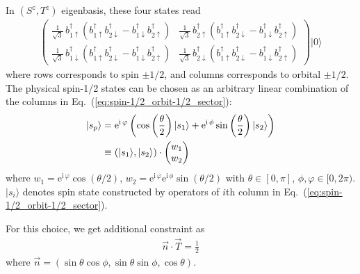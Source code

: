 \documentclass[%
 reprint,
 amsmath,amssymb,
 aps,
 pra, %
]{revtex4-1}
\newcommand{\ee}{\mathrm{e}}
\newcommand{\ii}{\mathrm{i}\,}
\newcommand{\dg}{\dagger}
\begin{document}
In $(S^z,T^z)$ eigenbasis, these four states read
\begin{align}
  \begin{pmatrix}
  \frac{1}{\sqrt{3}}\,b_{1\uparrow}^\dg\left( b_{1\uparrow}^\dg b_{2\downarrow}^\dg-b_{1\downarrow}^\dg b_{2\uparrow}^\dg \right) & 
  \frac{1}{\sqrt{3}}\,b_{2\uparrow}^\dg\left( b_{1\uparrow}^\dg b_{2\downarrow}^\dg-b_{1\downarrow}^\dg b_{2\uparrow}^\dg \right) \\[0.4cm]
  \frac{1}{\sqrt{3}}\,b_{1\downarrow}^\dg\left( b_{1\uparrow}^\dg b_{2\downarrow}^\dg-b_{1\downarrow}^\dg b_{2\uparrow}^\dg \right) & 
  \frac{1}{\sqrt{3}}\,b_{2\downarrow}^\dg\left( b_{1\uparrow}^\dg b_{2\downarrow}^\dg-b_{1\downarrow}^\dg b_{2\uparrow}^\dg \right) 
  \end{pmatrix}
  |0\rangle
  \label{eq:spin-1/2_orbit-1/2_sector}
\end{align}
where rows corresponds to spin $\pm1/2$, and columns corresponds to orbital $\pm1/2$.
The physical spin-1/2 states can be chosen as an arbitrary linear combination of the columns in Eq.~(\ref{eq:spin-1/2_orbit-1/2_sector}):
\begin{align}
  |s_p\rangle&=\ee^{\ii\varphi}\left(\cos\left( \frac{\theta}{2} \right)|s_1\rangle+\ee^{\ii\phi}\sin\left( \frac{\theta}{2} \right)|s_2\rangle \right)\notag\\
  &\equiv (|s_1\rangle, |s_2\rangle) \cdot \begin{pmatrix}w_1\\w_2\end{pmatrix} \label{}
\end{align}
where $w_1=\ee^{\ii\varphi}\cos(\theta/2)$, $w_2=\ee^{\ii\varphi}\ee^{\ii\phi}\sin(\theta/2)$ with $\theta\in[0,\pi]$, $\phi,\varphi\in[0,2\pi)$.
$|s_i\rangle$ denotes spin state constructed by operators of $i$th column in Eq.~(\ref{eq:spin-1/2_orbit-1/2_sector}). 

For this choice, we get additional constraint as
\begin{align}
  \vec{n}\cdot\vec{T}=\frac{1}{2}
  \label{}
\end{align}
where $\vec{n}=\left( \sin\theta\cos\phi,\sin\theta\sin\phi,\cos\theta \right)$.
\end{document}
